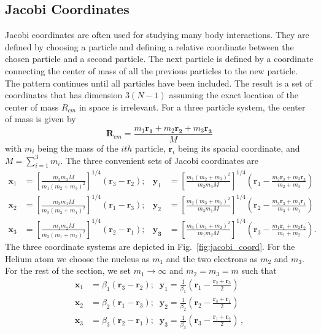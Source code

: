 \subsection{Jacobi Coordinates} %
\label{sub:jacobi_coordinates}
Jacobi coordinates are often used for studying many body interactions. They are defined by choosing a particle and defining a relative coordinate between the chosen particle and a second particle. The next particle is defined by a coordinate connecting the center of mass of all the previous particles to the new particle. The pattern continues until all particles have been included. The result is a set of coordinates that has dimension $3(N-1)$ assuming the exact location of the center of mass $R_{cm}$ in space is irrelevant. 
For a three particle system, the center of mass is given by
\begin{equation}
\mathbf{R}_{cm} = \frac{m_1 \mathbf{r_1} + m_2 \mathbf{r_2} + m_3 \mathbf{r_3}}{M}
\end{equation}
with $m_i$ being the mass of the $ith$ particle, $\mathbf{r}_i$ being its spacial coordinate, and $M = \sum_{i=1}^3m_i$.
The three convenient sets of Jacobi coordinates are
\begin{align}
\label{eq:jacobi_coords}
\mathbf{x}_1 &= \left[\frac{m_2m_3M}{m_1(m_2+m_3)^2}\right]^{1/4} (\mathbf{r}_3-\mathbf{r}_2); &\mathbf{y}_1 &= \left[\frac{m_1(m_2+m_3)^2}{m_2m_3M}\right]^{1/4} \left(\mathbf{r}_1- \frac{m_2\mathbf{r}_2+m_3\mathbf{r}_3}{m_2+m_3} \right)\\
\mathbf{x}_2 &= \left[\frac{m_3m_1M}{m_2(m_3+m_1)^2}\right]^{1/4} (\mathbf{r}_1-\mathbf{r}_3); &\mathbf{y}_2 &= \left[\frac{m_2(m_3+m_1)^2}{m_3m_1M}\right]^{1/4} \left(\mathbf{r}_2- \frac{m_3\mathbf{r}_3+m_1\mathbf{r}_1}{m_3+m_1} \right)\\
\mathbf{x}_3 &= \left[\frac{m_1m_2M}{m_3(m_1+m_2)^2}\right]^{1/4} (\mathbf{r}_2-\mathbf{r}_1); &\mathbf{y_3} &= \left[\frac{m_3(m_1+m_2)^2}{m_1m_2M}\right]^{1/4} \left(\mathbf{r}_3- \frac{m_1\mathbf{r}_1+m_2\mathbf{r}_2}{m_1+m_2} \right).
\end{align}
The three coordinate systems are depicted in Fig.~\ref{fig:jacobi_coord}. For the Helium atom we choose the nucleus as $m_1$ and the two electrons as $m_2$ and $m_3$. For the rest of the section, we set $m_1\rightarrow \infty$ and $m_2=m_3=m$ such that
\begin{align}
\mathbf{x}_1 &= \beta_1 (\mathbf{r}_3-\mathbf{r}_2); \; \; \mathbf{y}_1 = \frac{1}{\beta_1} \left(\mathbf{r}_1- \frac{\mathbf{r}_2+\mathbf{r}_3}{2} \right)\\
\mathbf{x}_2 &= \beta_2 (\mathbf{r}_1-\mathbf{r}_3); \; \; \mathbf{y}_2 = \frac{1}{\beta_2} \left(\mathbf{r}_2- \frac{\mathbf{r}_3+\mathbf{r}_1}{2} \right)\\
\mathbf{x}_3 &= \beta_3 (\mathbf{r}_2-\mathbf{r}_1); \; \; \mathbf{y}_3 = \frac{1}{\beta_3} \left(\mathbf{r}_3- \frac{\mathbf{r}_1+\mathbf{r}_2}{2} \right)\, ,
\end{align}
